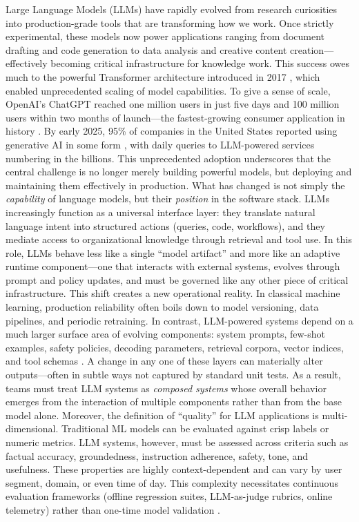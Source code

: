 Large Language Models (LLMs) have rapidly evolved from research curiosities into production-grade tools that are transforming how we work. Once strictly experimental, these models now power applications ranging from document drafting and code generation to data analysis and creative content creation—effectively becoming critical infrastructure for knowledge work. This success owes much to the powerful Transformer architecture introduced in 2017 \cite{Vaswani2017attention}, which enabled unprecedented scaling of model capabilities.
To give a sense of scale, OpenAI's ChatGPT reached one million users in just five days and 100 million users within two months of launch—the fastest-growing consumer application in history \cite{stylefactory,reuters}. By early 2025, 95\% of companies in the United States reported using generative AI in some form \cite{bain}, with daily queries to LLM-powered services numbering in the billions. This unprecedented adoption underscores that the central challenge is no longer merely building powerful models, but deploying and maintaining them effectively in production.
What has changed is not simply the \emph{capability} of language models, but their \emph{position} in the software stack. LLMs increasingly function as a universal interface layer: they translate natural language intent into structured actions (queries, code, workflows), and they mediate access to organizational knowledge through retrieval and tool use. In this role, LLMs behave less like a single ``model artifact'' and more like an adaptive runtime component—one that interacts with external systems, evolves through prompt and policy updates, and must be governed like any other piece of critical infrastructure.
This shift creates a new operational reality. In classical machine learning, production reliability often boils down to model versioning, data pipelines, and periodic retraining. In contrast, LLM-powered systems depend on a much larger surface area of evolving components: system prompts, few-shot examples, safety policies, decoding parameters, retrieval corpora, vector indices, and tool schemas \cite{liu2023promptSurvey,holtzman2020curious}. A change in any one of these layers can materially alter outputs—often in subtle ways not captured by standard unit tests. As a result, teams must treat LLM systems as \emph{composed systems} whose overall behavior emerges from the interaction of multiple components rather than from the base model alone.
Moreover, the definition of ``quality'' for LLM applications is multi-dimensional. Traditional ML models can be evaluated against crisp labels or numeric metrics. LLM systems, however, must be assessed across criteria such as factual accuracy, groundedness, instruction adherence, safety, tone, and usefulness. These properties are highly context-dependent and can vary by user segment, domain, or even time of day. This complexity necessitates continuous evaluation frameworks (offline regression suites, LLM-as-judge rubrics, online telemetry) rather than one-time model validation \cite{edge2025llmops}.
